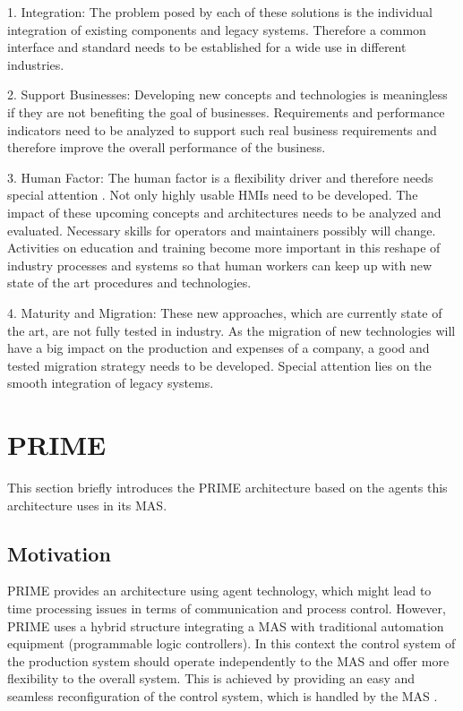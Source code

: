 \documentclass[conference,compsoc,hidelinks]{IEEEtran}
\begin{document}
1. Integration: The problem posed by each of these solutions is the individual integration of existing components and legacy systems. Therefore a common interface and standard needs to be established for a wide use in different industries.

2. Support Businesses: Developing new concepts and technologies is meaningless if they are not benefiting the goal of businesses. Requirements and performance indicators need to be analyzed to support such real business requirements and therefore improve the overall performance of the business.

3. Human Factor:  The human factor is a flexibility driver and therefore needs special attention \cite{Colombo2009}. Not only highly usable HMIs need to be developed. The impact of these upcoming concepts and architectures needs to be analyzed and evaluated. Necessary skills for operators and maintainers possibly will change. Activities on education and training become more important in this reshape of industry processes and systems so that human workers can keep up with new state of the art procedures and technologies.

4. Maturity and Migration: These new approaches, which are currently state of the art, are not fully tested in industry. As the migration of new technologies will have a big impact on the production and expenses of a company, a good and tested migration strategy needs to be developed. Special attention lies on the smooth integration of legacy systems.

\section{PRIME} \label{sec:PRIME}%

This section briefly introduces the PRIME architecture based on the agents this architecture uses in its MAS.
\subsection{Motivation}
PRIME provides an architecture using agent technology, which might lead to time processing issues in terms of communication and process control. However, PRIME uses a hybrid structure integrating a MAS with traditional automation equipment (programmable logic controllers). In this context the control system of the production system should operate independently to the MAS and offer more flexibility to the overall system. This is achieved by providing an easy and seamless reconfiguration of the control system, which is handled by the MAS \cite{Hybrid}.
\end{document}
